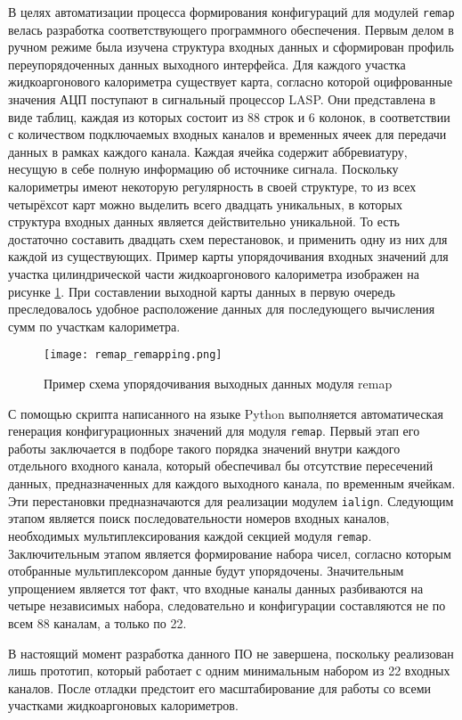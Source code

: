 В целях автоматизации процесса формирования конфигураций для модулей \texttt{remap} велась разработка соответствующего программного обеспечения. Первым делом в ручном режиме была изучена структура входных данных и сформирован профиль переупорядоченных данных выходного интерфейса. Для каждого участка жидкоаргонового калориметра существует карта, согласно которой оцифрованные значения АЦП поступают в сигнальный процессор LASP. Они представлена в виде таблиц, каждая из которых состоит из 88 строк и 6 колонок, в соответствии с количеством подключаемых входных каналов и временных ячеек для передачи данных в рамках каждого канала. Каждая ячейка содержит аббревиатуру, несущую в себе полную информацию об источнике сигнала. Поскольку калориметры имеют некоторую регулярность в своей структуре, то из всех четырёхсот карт можно выделить всего двадцать уникальных, в которых структура входных данных является действительно уникальной. То есть достаточно составить двадцать схем перестановок, и применить одну из них для каждой из существующих. Пример карты упорядочивания входных значений для участка цилиндрической части жидкоаргонового калориметра изображен на рисунке \ref{fig:remap_remapping}. При составлении выходной карты данных в первую очередь преследовалось удобное расположение данных для последующего вычисления сумм по участкам калориметра.\par
\begin{figure}[ht]
    \centering
    \texttt{[image: remap\_remapping.png]}
    \caption{Пример схема упорядочивания выходных данных модуля remap}
    \label{fig:remap_remapping}
\end{figure}\par
С помощью скрипта написанного на языке Python выполняется автоматическая генерация конфигурационных значений для модуля \texttt{remap}. Первый этап его работы заключается в подборе такого порядка значений внутри каждого отдельного входного канала, который обеспечивал бы отсутствие пересечений данных, предназначенных для каждого выходного канала, по временным ячейкам. Эти перестановки предназначаются для реализации модулем \texttt{ialign}. Следующим этапом является поиск последовательности номеров входных каналов, необходимых мультиплексирования каждой секцией модуля \texttt{remap}. Заключительным этапом является формирование набора чисел, согласно которым отобранные мультиплексором данные будут упорядочены. Значительным упрощением является тот факт, что входные каналы данных разбиваются на четыре независимых набора, следовательно и конфигурации составляются не по всем 88 каналам, а только по 22.\par
В настоящий момент разработка данного ПО не завершена, поскольку реализован лишь прототип, который работает с одним минимальным набором из 22 входных каналов. После отладки предстоит его масштабирование для работы со всеми участками жидкоаргоновых калориметров.\par
